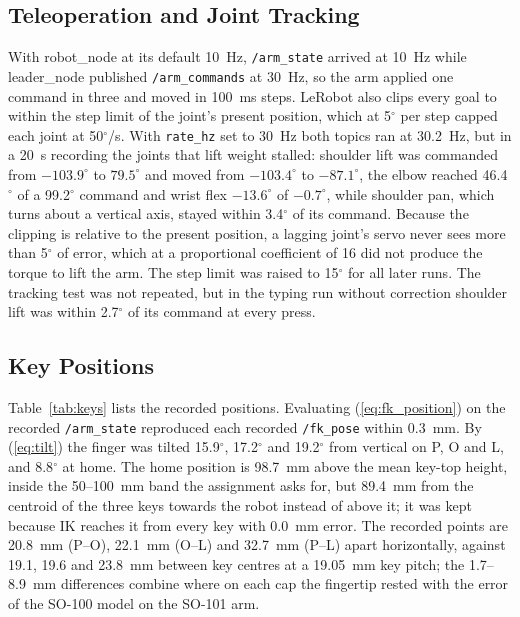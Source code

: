 \documentclass[letterpaper, 10 pt, conference]{ieeeconf}
\begin{document}
\subsection{Teleoperation and Joint Tracking}
\label{sec:teleop}
With robot\_node at its default 10~Hz, \texttt{/arm\_state} arrived at 10~Hz while leader\_node published
\texttt{/arm\_commands} at 30~Hz, so the arm applied one command in three and moved in 100~ms steps.
LeRobot also clips every goal to within the step limit of the joint's present position, which at 5$^\circ$
per step capped each joint at 50$^\circ$/s. With \texttt{rate\_hz} set to 30~Hz both topics ran at 30.2~Hz,
but in a 20~s recording the joints that lift weight stalled: shoulder lift was commanded from $-103.9^\circ$
to $79.5^\circ$ and moved from $-103.4^\circ$ to $-87.1^\circ$, the elbow reached 46.4$^\circ$ of a
99.2$^\circ$ command and wrist flex $-13.6^\circ$ of $-0.7^\circ$, while shoulder pan, which turns about a
vertical axis, stayed within 3.4$^\circ$ of its command. Because the clipping is relative to the present
position, a lagging joint's servo never sees more than 5$^\circ$ of error, which at a proportional
coefficient of 16 did not produce the torque to lift the arm. The step limit was raised to 15$^\circ$ for all
later runs. The tracking test was not repeated, but in the typing run without correction shoulder lift was
within 2.7$^\circ$ of its command at every press.

\subsection{Key Positions}
Table~\ref{tab:keys} lists the recorded positions. Evaluating (\ref{eq:fk_position}) on the recorded
\texttt{/arm\_state} reproduced each recorded \texttt{/fk\_pose} within 0.3~mm. By (\ref{eq:tilt}) the
finger was tilted 15.9$^\circ$, 17.2$^\circ$ and 19.2$^\circ$ from vertical on P, O and L, and 8.8$^\circ$ at
home. The home position is 98.7~mm above the mean key-top height, inside the 50--100~mm band the assignment
asks for, but 89.4~mm from the centroid of the three keys towards the robot instead of above it; it was kept
because IK reaches it from every key with 0.0~mm error. The recorded points are 20.8~mm (P--O), 22.1~mm (O--L) and 32.7~mm (P--L) apart horizontally,
against 19.1, 19.6 and 23.8~mm between key centres at a 19.05~mm key pitch; the 1.7--8.9~mm differences combine
where on each cap the fingertip rested with the error of the SO-100 model on the SO-101 arm.
\end{document}
